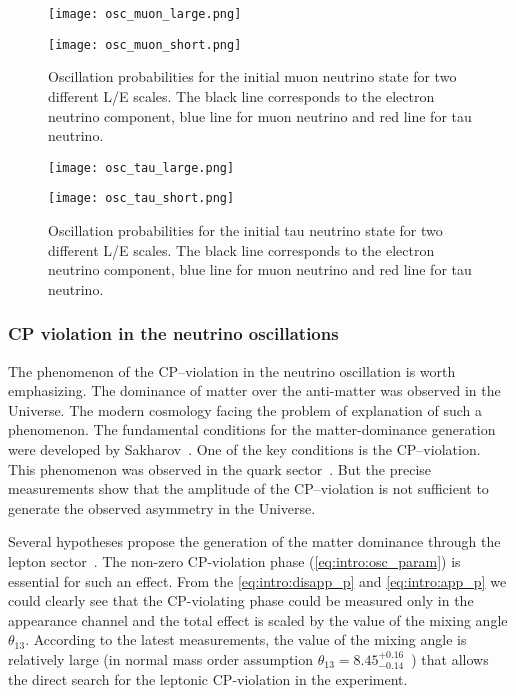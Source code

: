 \documentclass[../main.tex]{subfiles}
\begin{document}
\begin{figure}
\centering
\begin{minipage}{0.4\linewidth}
  \texttt{[image: osc\_muon\_large.png]}
\end{minipage}
\hfill
\begin{minipage}{0.4\linewidth}
  \texttt{[image: osc\_muon\_short.png]}
\end{minipage}
\caption{Oscillation probabilities for the initial muon neutrino state for two different L/E scales. The black line corresponds to the electron neutrino component, blue line for muon neutrino and red line for tau neutrino.}
\label{fig:intro:osc2}
\end{figure}

\begin{figure}
\centering
\begin{minipage}{0.4\linewidth}
  \texttt{[image: osc\_tau\_large.png]}
\end{minipage}
\hfill
\begin{minipage}{0.4\linewidth}
  \texttt{[image: osc\_tau\_short.png]}
\end{minipage}
\caption{Oscillation probabilities for the initial tau neutrino state for two different L/E scales. The black line corresponds to the electron neutrino component, blue line for muon neutrino and red line for tau neutrino.}
\label{fig:intro:osc3}
\end{figure}

\subsubsection{CP violation in the neutrino oscillations}
\label{sec:intro:cp}
The phenomenon of the CP--violation in the neutrino oscillation is worth emphasizing. The dominance of matter over the anti-matter was observed in the Universe. The modern cosmology facing the problem of explanation of such a phenomenon. The fundamental conditions for the matter-dominance generation were developed by Sakharov~\cite{Sakharov1967}. One of the key conditions is the CP--violation. This phenomenon was observed in the quark sector~\cite{Tanabashi2018}. But the precise measurements show that the amplitude of the CP--violation is not sufficient to generate the observed asymmetry in the Universe.

Several hypotheses propose the generation of the matter dominance through the lepton sector~\cite{Davidson2008}. The non-zero CP-violation phase (\autoref{eq:intro:osc_param}) is essential for such an effect. From the \autoref{eq:intro:disapp_p} and \autoref{eq:intro:app_p} we could clearly see that the CP-violating phase could be measured only in the appearance channel and the total effect is scaled by the value of the mixing angle $\theta_{13}$. According to the latest measurements, the value of the mixing angle is relatively large (in normal mass order assumption $\theta_{13}=8.45^{+0.16}_{-0.14}$~\cite{DeSalas2018}) that allows the direct search for the leptonic CP-violation in the experiment.
\end{document}
